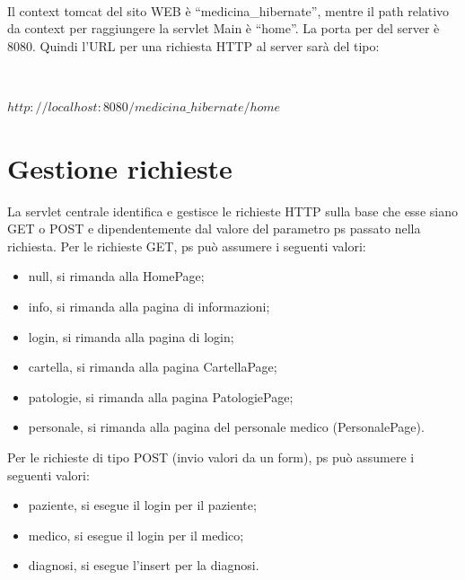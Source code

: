 \documentclass[a4paper,titlepage]{article}
\begin{document}
~

Il context tomcat del sito WEB è ``medicina\_hibernate'', mentre il path relativo da context per raggiungere la 
servlet Main è ``home''. La porta per del server è 8080. Quindi l'URL per una richiesta HTTP al 
server sarà del tipo:

~

$http://localhost:8080/medicina\_hibernate/home$

\part{Gestione richieste}

La servlet centrale identifica e gestisce le richieste HTTP sulla base che esse siano GET o POST e 
dipendentemente dal valore del parametro ps passato nella richiesta.
Per le richieste GET, ps può assumere i seguenti valori:

\begin{itemize}[leftmargin=0.5cm, topsep=0.25cm, itemsep=0.2cm]

\item null, si rimanda alla HomePage;

\item info, si rimanda alla pagina di informazioni;

\item login, si rimanda alla pagina di login;

\item cartella, si rimanda alla pagina CartellaPage;

\item patologie, si rimanda alla pagina PatologiePage;

\item personale, si rimanda alla pagina del personale medico (PersonalePage). 

\end{itemize}


Per le richieste di tipo POST (invio valori da un form), ps può assumere i seguenti valori:

\begin{itemize}[leftmargin=0.5cm, topsep=0.25cm, itemsep=0.2cm]

\item paziente, si esegue il login per il paziente;

\item medico, si esegue il login per il medico;

\item diagnosi, si esegue l'insert per la diagnosi.

\end{itemize}
\end{document}
